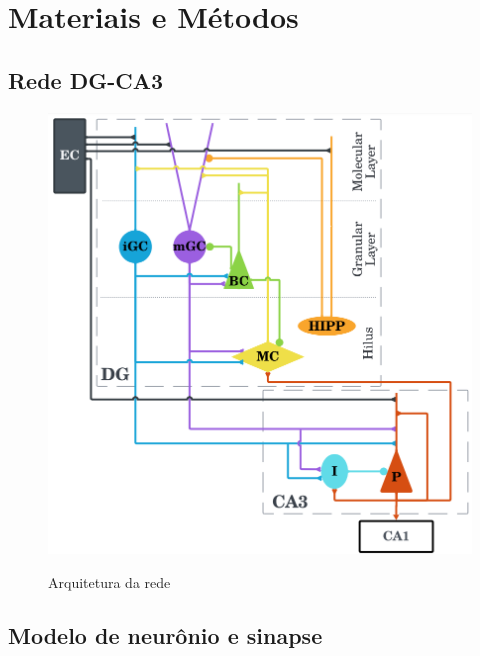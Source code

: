 \chapter{Materiais e Métodos}

\section{Rede DG-CA3}



\begin{figure}
    \centering
    \caption{Arquitetura da rede}
    \includegraphics[scale=0.3]{figuras/arquitetura-rede.png}
    \label{fig:arquitetura-rede}
\end{figure}


\section{Modelo de neurônio e sinapse}




